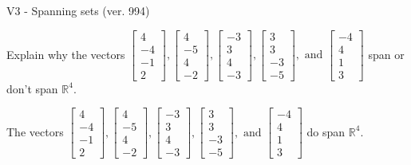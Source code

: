 \begin{exercise}
  \begin{exerciseTitle}V3 - Spanning sets (ver. 994)\end{exerciseTitle}
  \begin{exerciseStatement}
    Explain why the vectors \(\left[\begin{array}{r}
4 \\
-4 \\
-1 \\
2
\end{array}\right] , \left[\begin{array}{r}
4 \\
-5 \\
4 \\
-2
\end{array}\right] , \left[\begin{array}{r}
-3 \\
3 \\
4 \\
-3
\end{array}\right] , \left[\begin{array}{r}
3 \\
3 \\
-3 \\
-5
\end{array}\right] , \text{ and } \left[\begin{array}{r}
-4 \\
4 \\
1 \\
3
\end{array}\right]\) span or don't span \(\mathbb{R}^4\). 
	


  \end{exerciseStatement}
  \begin{exerciseAnswer}
   The vectors \(\left[\begin{array}{r}
4 \\
-4 \\
-1 \\
2
\end{array}\right] , \left[\begin{array}{r}
4 \\
-5 \\
4 \\
-2
\end{array}\right] , \left[\begin{array}{r}
-3 \\
3 \\
4 \\
-3
\end{array}\right] , \left[\begin{array}{r}
3 \\
3 \\
-3 \\
-5
\end{array}\right] , \text{ and } \left[\begin{array}{r}
-4 \\
4 \\
1 \\
3
\end{array}\right]\) 
  	 do  
	span \(\mathbb{R}^4\).
  



\end{exerciseAnswer}
\end{exercise}
